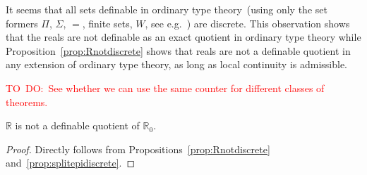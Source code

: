 \documentclass[envcountsame]{llncs}
\newcommand{\todo}[1]{\textcolor{red}{TO~DO:~#1}}
\newcommand{\R}{\mathbb{R}}
\begin{document}
It seems that all sets definable in ordinary type theory~(using only the set formers $\Pi$, $\Sigma$, $=$, finite sets, $W$, see e.g.~\cite{Bengt, Peter Aczel}) are discrete. This observation shows that the reals are not  definable as an exact quotient in ordinary type theory while Proposition~\ref{prop:Rnotdiscrete} shows that reals are not a definable  quotient in any extension of ordinary type theory, as long as local continuity is admissible.

\todo{See whether we can use the same counter for different classes of theorems.}

\begin{corollary}
$\R$ is not a definable quotient of $\R_0$.
\end{corollary}
\begin{proof}
Directly follows from Propositions~\ref{prop:Rnotdiscrete} and~\ref{prop:splitepidiscrete}.
\end{proof}
\end{document}
